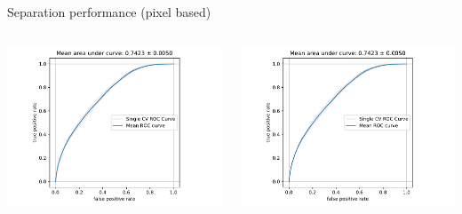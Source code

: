 \begin{frame}[t]{Separation performance (pixel based)}
  \begin{columns}[onlytextwidth]
    \begin{column}{0.475\textwidth}
      \centering
      \includegraphics[width=1.1\textwidth, page=1]{fig/separation_performance_nc_diff.pdf}
    \end{column}
  \hfill%
    \begin{column}{0.475\textwidth}
        \centering
        \includegraphics[width=\textwidth, page=2]{fig/separation_performance_nc_diff.pdf}
    \end{column}
  \end{columns}
\end{frame}

